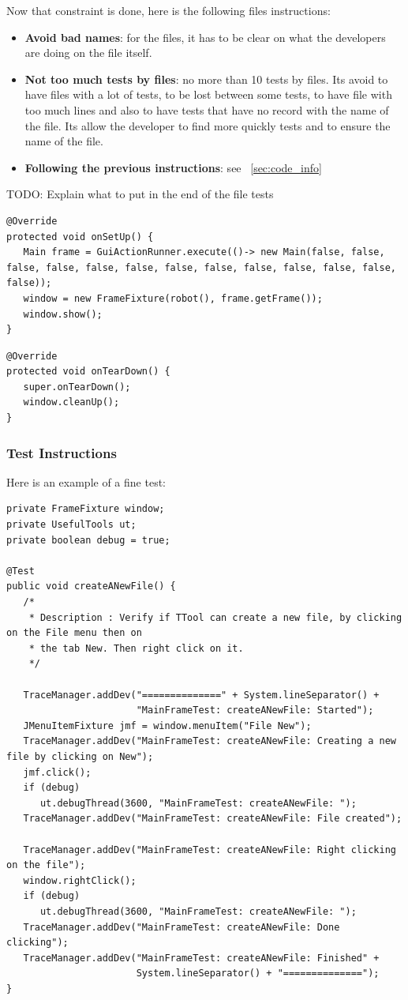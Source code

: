 \documentclass[12pt]{article}
\begin{document}
Now that constraint is done, here is the following files instructions:

\begin{itemize}
  \item \textbf{Avoid bad names}: for the files, it has to be clear on what the developers are doing on the file itself.
  \item \textbf{Not too much tests by files}: no more than 10 tests by files. Its avoid to have files with a lot of tests, to be lost between some tests, to have file with too much lines and also to have tests that have no record with the name of the file. Its allow the developer to find more quickly tests and to ensure the name of the file.
  \item \textbf{Following the previous instructions}: see ~\ref{sec:code_info}
\end{itemize}

TODO: Explain what to put in the end of the file tests

\begin{verbatim}
@Override
protected void onSetUp() {
   Main frame = GuiActionRunner.execute(()-> new Main(false, false, false, false, false, false, false, false, false, false, false, false, false));
   window = new FrameFixture(robot(), frame.getFrame());
   window.show();
}
\end{verbatim}
\begin{verbatim}
@Override
protected void onTearDown() {
   super.onTearDown();
   window.cleanUp();
}
\end{verbatim}

\subsubsection{Test Instructions}
Here is an example of a fine test:
\begin{verbatim}
private FrameFixture window;
private UsefulTools ut;
private boolean debug = true;

@Test
public void createANewFile() {
   /*
    * Description : Verify if TTool can create a new file, by clicking on the File menu then on
    * the tab New. Then right click on it.
    */

   TraceManager.addDev("==============" + System.lineSeparator() +
                       "MainFrameTest: createANewFile: Started");
   JMenuItemFixture jmf = window.menuItem("File New");
   TraceManager.addDev("MainFrameTest: createANewFile: Creating a new file by clicking on New");
   jmf.click();
   if (debug)
      ut.debugThread(3600, "MainFrameTest: createANewFile: ");
   TraceManager.addDev("MainFrameTest: createANewFile: File created");
		
   TraceManager.addDev("MainFrameTest: createANewFile: Right clicking on the file");
   window.rightClick();
   if (debug)
      ut.debugThread(3600, "MainFrameTest: createANewFile: ");
   TraceManager.addDev("MainFrameTest: createANewFile: Done clicking");
   TraceManager.addDev("MainFrameTest: createANewFile: Finished" + 
                       System.lineSeparator() + "==============");
}
\end{verbatim}
\end{document}
